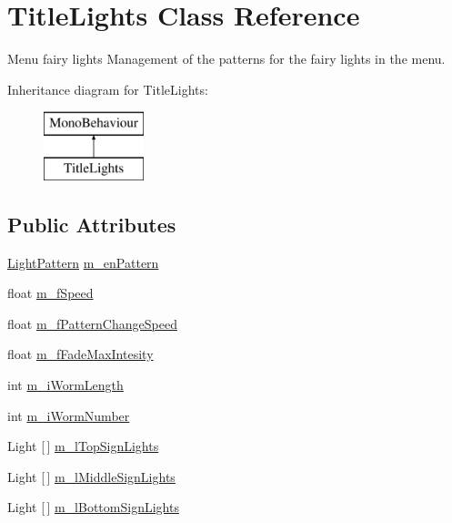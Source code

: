 \hypertarget{class_title_lights}{}\section{Title\+Lights Class Reference}
\label{class_title_lights}


Menu fairy lights Management of the patterns for the fairy lights in the menu.  


Inheritance diagram for Title\+Lights\+:\begin{figure}[H]
\begin{center}
\leavevmode
\includegraphics[height=2.000000cm]{class_title_lights}
\end{center}
\end{figure}
\subsection*{Public Attributes}
\begin{DoxyCompactItemize}
\item 
\mbox{\hyperlink{_title_lights_8cs_a87e3f8652ad535a03a2b448824edab1c}{Light\+Pattern}} \mbox{\hyperlink{class_title_lights_af8aee6bf3ea00b4b358383b22b1798aa}{m\+\_\+en\+Pattern}}
\item 
float \mbox{\hyperlink{class_title_lights_ae0b4ae86320d22122ecda0fadc6e1370}{m\+\_\+f\+Speed}}
\item 
float \mbox{\hyperlink{class_title_lights_aaed699cf6f7ab4b370640d10ac3dde58}{m\+\_\+f\+Pattern\+Change\+Speed}}
\item 
float \mbox{\hyperlink{class_title_lights_a163d2c0d99fd988de11e766de52f0153}{m\+\_\+f\+Fade\+Max\+Intesity}}
\item 
int \mbox{\hyperlink{class_title_lights_af991609535f2508c7f6f8f9c4db5266e}{m\+\_\+i\+Worm\+Length}}
\item 
int \mbox{\hyperlink{class_title_lights_ad4b72c134541a01977825b07bb4e55f7}{m\+\_\+i\+Worm\+Number}}
\item 
Light \mbox{[}$\,$\mbox{]} \mbox{\hyperlink{class_title_lights_a212e3e0e32af765370d85dfccec60014}{m\+\_\+l\+Top\+Sign\+Lights}}
\item 
Light \mbox{[}$\,$\mbox{]} \mbox{\hyperlink{class_title_lights_a9fd28d0f50d7274e564cc0f037da94a1}{m\+\_\+l\+Middle\+Sign\+Lights}}
\item 
Light \mbox{[}$\,$\mbox{]} \mbox{\hyperlink{class_title_lights_aed75f5c52bff664852103dbea27d34e9}{m\+\_\+l\+Bottom\+Sign\+Lights}}
\end{DoxyCompactItemize}



